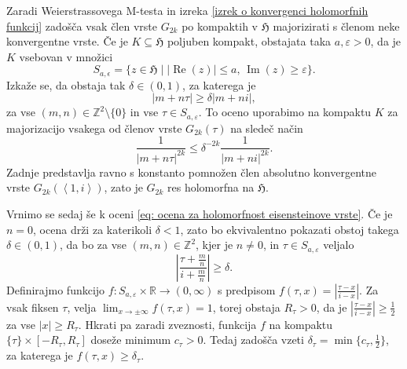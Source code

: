 \documentclass[mat1]{fmfdelo}
\numberwithin{equation}{section}
\newcommand{\R}{\mathbb R}
\newcommand{\Z}{\mathbb Z}
\newcommand{\HH}{\mathfrak{H}}
\newcommand{\abs}[1]{\left\lvert #1 \right\rvert}
\newcommand{\lattice}[2]{\left\langle #1, #2 \right\rangle}
\renewcommand\Re{\operatorname{Re}}%
\renewcommand\Im{\operatorname{Im}}%
\theoremstyle{definition}
\begin{document}
\begin{dokaz}
    Zaradi Weierstrassovega M-testa in izreka \ref{izrek o konvergenci holomorfnih funkcij} zadošča vsak člen vrste $G_{2k}$ po kompaktih v $\HH$ majorizirati s členom neke konvergentne vrste. Če je $K \subseteq \HH$ poljuben kompakt, obstajata taka $a, \varepsilon > 0$, da je $K$ vsebovan v množici 
    \[
        S_{a,\epsilon} = \{z \in \HH \mid \abs{\Re(z)} \leq a \text{, } \Im(z) \geq \varepsilon \}.
    \]
    Izkaže se, da obstaja tak $\delta \in (0,1)$, za katerega je
    \begin{equation}
        \label{eq: ocena za holomorfnost eisensteinove vrste}
        \abs{m + n\tau} \geq \delta\abs{m + ni},  
    \end{equation}
    za vse $(m, n) \in \Z^2\setminus\{0\}$ in vse $\tau \in S_{a,\varepsilon}$. To oceno uporabimo na kompaktu $K$ za majorizacijo vsakega od členov vrste $G_{2k}(\tau)$ na sledeč način
    \[
        \frac{1}{\abs{m + n\tau}^{2k}} \leq \delta^{-2k}\frac{1}{\abs{m + ni}^{2k}}.
    \]
    Zadnje predstavlja ravno s konstanto pomnožen člen absolutno konvergentne vrste $G_{2k}(\lattice{1}{i})$, zato je $G_{2k}$ res holomorfna na $\HH$.


    Vrnimo se sedaj še k oceni \ref{eq: ocena za holomorfnost eisensteinove vrste}. Če je $n = 0$, ocena drži za katerikoli $\delta < 1$, zato bo ekvivalentno pokazati obstoj takega $\delta \in (0,1)$, da bo za vse $(m,n) \in \Z^2$, kjer je $n \neq 0$, in $\tau \in S_{a,\varepsilon}$ veljalo
    \[
        \abs{\frac{\tau + \tfrac{m}{n}}{i + \tfrac{m}{n}}} \geq \delta.
    \]
    Definirajmo funkcijo $f: S_{a, \varepsilon} \times \R \to (0,\infty)$ s predpisom $f(\tau, x) = \abs{\tfrac{\tau - x}{i - x}}$. Za vsak fiksen $\tau$, velja $\lim_{x \to \pm\infty} f(\tau, x) = 1$, torej obstaja $R_\tau > 0$, da je $\abs{\tfrac{\tau - x}{i - x}} \geq \tfrac{1}{2}$ za vse $\abs{x} \geq R_\tau$. Hkrati pa zaradi zveznosti, funkcija $f$ na kompaktu $\{\tau\} \times [-R_\tau, R_\tau]$ doseže minimum $c_\tau > 0$. Tedaj zadošča vzeti $\delta_\tau = \min\{c_\tau, \tfrac{1}{2}\}$, za katerega je $f(\tau, x) \geq \delta_\tau$.


\end{dokaz}
\end{document}
